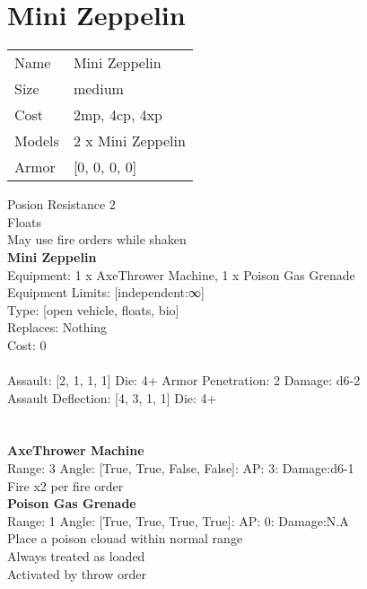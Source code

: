 \pagebreak\pagebreak

\section{ Mini Zeppelin }

\begin{tabular}{ll}
  Name & Mini Zeppelin \\
  Size & medium\\
  Cost & 2mp, 4cp, 4xp\\
  Models & 2 x Mini Zeppelin\\
  Armor & [0, 0, 0, 0]\\
\end{tabular}

\noindent Posion Resistance 2\\ 
Floats\\ 
May use fire orders while shaken\\ 


{\bf Mini Zeppelin } \\
Equipment: 1 x AxeThrower Machine, 1 x Poison Gas Grenade \\
Equipment Limits: [independent:∞] \\
Type: [open vehicle, floats, bio] \\
Replaces: Nothing \\
Cost: 0\\
\ \\
Assault: [2, 1, 1, 1] Die: 4+ Armor Penetration: 2 Damage: d6-2 \\
Assault Deflection: [4, 3, 1, 1] Die: 4+\\
\indent  
\ \\

\ \\
{\bf AxeThrower Machine } \\



Range: 3  Angle: [True, True, False, False]: AP: 3: Damage:d6-1 \\
Fire x2 per fire order\\ 




{\bf Poison Gas Grenade } \\



Range: 1  Angle: [True, True, True, True]: AP: 0: Damage:N.A \\
Place a poison clouad within normal range\\ 
Always treated as loaded\\ 
Activated by throw order\\ 




